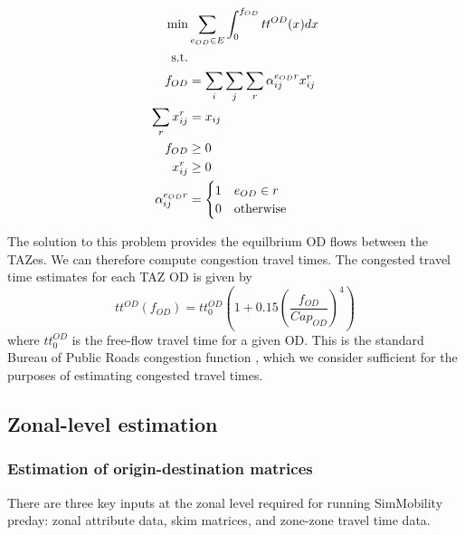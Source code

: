 \documentclass[11pt,twoside]{article}
\numberwithin{equation}{section}
\newcommand{\lt}{\left}
\newcommand{\rt}{\right}
\newcommand{\?}{\stackrel{?}{=}}
\newcommand{\fr}{\frac}
\begin{document}
\begin{align}
  \min & \sum_{e_{OD} \in E} \int_{0}^{f_{OD}}tt^{OD}(x) dx \\ \notag
  \text{s.t.} & \\
  f_{OD} &= \sum_{i}\sum_{j}\sum_{r}\alpha_{ij}^{e_{OD}r}x_{ij}^{r}\\
  \sum_r x_{ij}^{r} &= x_{ij} \\
  f_{OD} &\ge 0 \\
  x_{ij}^{r}& \ge 0 \\
  \alpha_{ij}^{e_{OD}r} &=
                          \begin{cases}
                            1 & e_{OD} \in r \\
                            0 & \text{otherwise}
                          \end{cases}
\end{align}

The solution to this problem provides the equilbrium OD flows between the TAZes.
We can therefore compute congestion travel times.
The congested travel time estimates for each TAZ OD is given by
\begin{equation}
  \label{eq:tt}
  tt^{OD}(f_{OD}) = tt_0^{OD}\lt(1 + 0.15\lt( \fr{f_{OD}}{Cap_{OD}}\rt)^4\rt)
\end{equation}
where $tt_0^{OD}$ is the free-flow travel time for a given OD. 
This is the standard Bureau of Public Roads congestion function \citep{mtoi2014calibration}, which we consider sufficient for the purposes of estimating congested travel times.


\subsection{Zonal-level  estimation}
\subsubsection{Estimation of origin-destination matrices}
There are three key inputs at the zonal level required for running SimMobility preday: zonal attribute data, skim matrices, and zone-zone travel time data.
\end{document}
